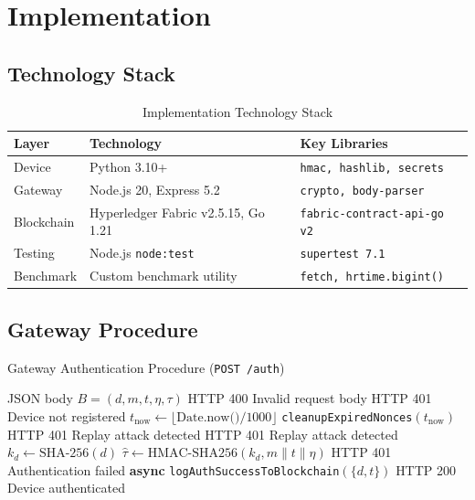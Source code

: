\documentclass[conference]{IEEEtran}
\begin{document}
\section{Implementation}
\label{sec:impl}

\subsection{Technology Stack}

\begin{table}[!htbp]
\caption{Implementation Technology Stack}
\label{tab:stack}
\centering
\setlength{\tabcolsep}{4pt}
\renewcommand{\arraystretch}{1.2}
\begin{tabularx}{\columnwidth}{@{}L{1.5cm}L{3.0cm}L{3.0cm}@{}}
\toprule
\textbf{Layer} & \textbf{Technology} & \textbf{Key Libraries} \\
\midrule
Device     & Python 3.10+                        & \texttt{hmac, hashlib, secrets} \\
Gateway    & Node.js 20, Express 5.2             & \texttt{crypto, body-parser} \\
Blockchain & Hyperledger Fabric v2.5.15, Go 1.21 & \texttt{fabric-contract-api-go v2} \\
Testing    & Node.js \texttt{node:test}           & \texttt{supertest 7.1} \\
Benchmark  & Custom benchmark utility            & \texttt{fetch, hrtime.bigint()} \\
\bottomrule
\end{tabularx}
\end{table}

\subsection{Gateway Procedure}

\begin{algorithm}[!htbp]
\caption{Gateway Authentication Procedure (\texttt{POST /auth})}
\label{alg:gateway}
\begin{algorithmic}[1]
\REQUIRE JSON body $B=(d,m,t,\eta,\tau)$
    \RETURN \textsc{HTTP 400} Invalid request body
\ENDIF
{}
    \RETURN \textsc{HTTP 401} Device not registered
\ENDIF
\STATE $t_{\text{now}} \leftarrow \lfloor \text{Date.now()}/1000 \rfloor$
\STATE \texttt{cleanupExpiredNonces}$(t_{\text{now}})$
    \RETURN \textsc{HTTP 401} Replay attack detected
\ENDIF
{}
    \RETURN \textsc{HTTP 401} Replay attack detected
\ENDIF
\STATE $k_d \leftarrow \text{SHA-256}(d)$
\STATE $\hat{\tau} \leftarrow \text{HMAC-SHA256}(k_d, m\|t\|\eta)$
    \RETURN \textsc{HTTP 401} Authentication failed
\ENDIF
\STATE \textbf{async} \texttt{logAuthSuccessToBlockchain}$(\{d,t\})$
\RETURN \textsc{HTTP 200} Device authenticated
\end{algorithmic}
\end{algorithm}
\end{document}
